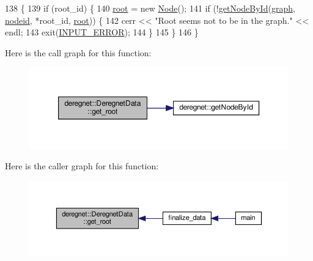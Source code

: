 \begin{DoxyCode}
138                                               \{
139     \textcolor{keywordflow}{if} (root\_id) \{
140         \hyperlink{classderegnet_1_1DeregnetData_a51a22fd88f929b1b1a00edb409b4cd55}{root} = \textcolor{keyword}{new} \hyperlink{namespacederegnet_a744bad34f2de9856d36715a445f027f3}{Node}();
141         \textcolor{keywordflow}{if} (!\hyperlink{namespacederegnet_afefc9088a0ea47e8d8c1225b5de29244}{getNodeById}(\hyperlink{classderegnet_1_1DeregnetData_ab76d30fa2ef87099faecb31e3f95b6d6}{graph}, \hyperlink{classderegnet_1_1DeregnetData_a3b57d7ed19c104c7fe257e17f0d2cfb5}{nodeid}, *root\_id, \hyperlink{classderegnet_1_1DeregnetData_a51a22fd88f929b1b1a00edb409b4cd55}{root})) \{
142             cerr << \textcolor{stringliteral}{"Root seems not to be in the graph."} << endl;
143             exit(\hyperlink{DeregnetData_8hpp_a288116f92845fddefeb044f5b84bc889}{INPUT\_ERROR});
144         \}
145     \}
146 \}
\end{DoxyCode}
Here is the call graph for this function\+:\nopagebreak
\begin{figure}[H]
\begin{center}
\leavevmode
\includegraphics[width=350pt]{classderegnet_1_1DeregnetData_aaef262d5ca460f10851b25c01ad2f9bc_cgraph}
\end{center}
\end{figure}
Here is the caller graph for this function\+:\nopagebreak
\begin{figure}[H]
\begin{center}
\leavevmode
\includegraphics[width=350pt]{classderegnet_1_1DeregnetData_aaef262d5ca460f10851b25c01ad2f9bc_icgraph}
\end{center}
\end{figure}
\mbox{\label{classderegnet_1_1DeregnetData_ae5edd8f077b20056f416d42ef3fb03d2}} 
